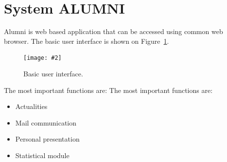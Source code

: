 \documentclass{iitsrc}[2006/14/02]
\newcommand\fig[4]{%
	\begin{figure}[h]
	\begin{center}
	\texttt{[image: \#2]}
	~\\%
	\caption{#4}
	\label{#3}
	\end{center}
	\end{figure}
}
\begin{document}



\section{System ALUMNI}

Alumni is web based application that can be accessed using common web browser. The basic user interface is shown on Figure~\ref{fig:scr1}. 

\fig{width=12cm, bb = 0 0 831 683}{images/screen1.png}{fig:scr1}{Basic user interface.}

The most important functions are:
The most important functions are:
\begin{itemize}
\item Actualities
\item Mail communication
\item Personal presentation
\item Statistical module
\end{itemize}
\end{document}
